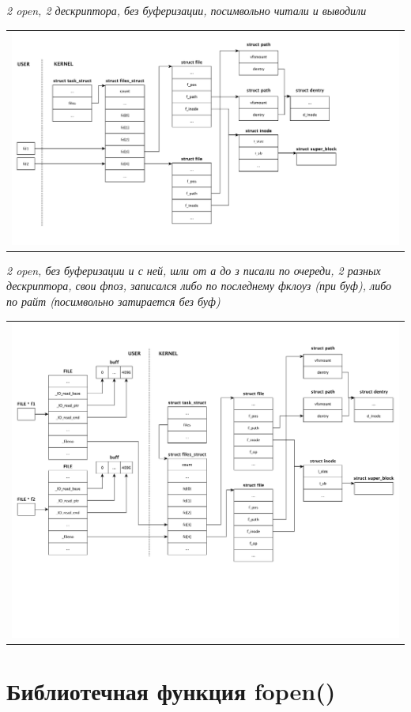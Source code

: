 \textit{2 open, 2 дескриптора, без буферизации, посимвольно читали и выводили}
\begin{table}[H]
  \centering
  \begin{tabular}{p{1\linewidth}}
    \centering
    \includegraphics[width=0.8\linewidth]{./images/scheme2.pdf}
  \end{tabular}
\end{table}

\textit{2 open, без буферизации и с ней, шли от а до з писали по очереди, 2 разных дескриптора, свои фпоз, записался либо по последнему фклоуз (при буф), либо по райт (посимвольно затирается без буф)}
\begin{table}[H]
  \centering
  \begin{tabular}{p{1\linewidth}}
    \centering
    \includegraphics[width=0.8\linewidth]{./images/scheme3.pdf}
  \end{tabular}
\end{table}

\section{Библиотечная функция fopen()}

